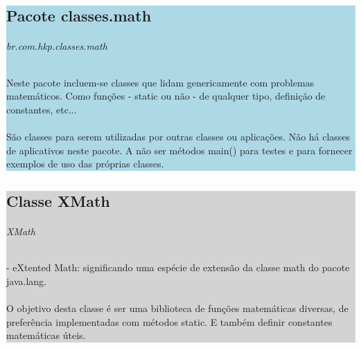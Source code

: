 \documentclass[a4paper,12pt,openany]{book}
\begin{document}
\colorbox{lightblue}{
	
\begin{minipage}{18cm}
	
\part*{Pacote classes.math}

\paragraph{br.com.hkp.classes.math}

Neste pacote incluem-se classes que lidam genericamente com problemas matemáticos. Como funções - static ou não -  de qualquer tipo, definição de constantes, etc...
\\
\\
São classes para serem utilizadas por outras classes ou aplicações. Não há classes de aplicativos neste pacote. A não ser métodos main() para testes e para fornecer exemplos de uso das próprias classes.

\end{minipage}

}%

\newpage


\colorbox{lightgrey}{
	
\begin{minipage}{18cm}
	
\chapter*{Classe XMath}

\paragraph{XMath} - eXtented Math: significando uma espécie de extensão da classe math do pacote java.lang.
\\
\\
O objetivo desta classe é ser uma biblioteca de funções matemáticas diversas,
de preferência implementadas com métodos static. E também definir constantes
matemáticas úteis.

\end{minipage}

}%
\end{document}
